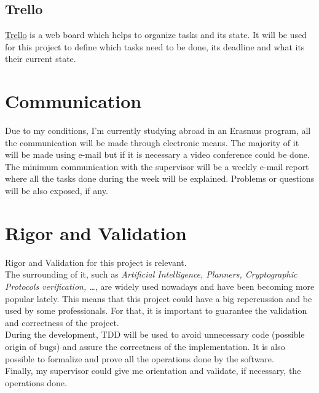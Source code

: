 \subsection{Trello}
\href{https://trello.com}{Trello} is a web board which helps to organize tasks and its state. It will be used for this project to define which tasks need to be done, its deadline and what its their current state. 

\section{Communication}
Due to my conditions, I'm currently studying abroad in an Erasmus program, all the communication will be made through electronic means. The majority of it will be made using e-mail but if it is necessary a video conference could be done. \\
The minimum communication with the supervisor will be a weekly e-mail report where all the tasks done during the week will be explained. Problems or questions will be also exposed, if any.

\section{Rigor and Validation}
Rigor and Validation for this project is relevant. \\
The surrounding of it, such as \emph{Artificial Intelligence, Planners, Cryptographic Protocols verification, \ldots}, are widely used nowadays and have been becoming more popular lately. This means that this project could have a big repercussion and be used by some professionals. For that, it is important to guarantee the validation and correctness of the project. \\
During the development, TDD will be used to avoid unnecessary code (possible origin of bugs) and assure the correctness of the implementation. It is also possible to formalize and prove all the operations done by the software.\\
Finally, my supervisor could give me orientation and validate, if necessary, the operations done.